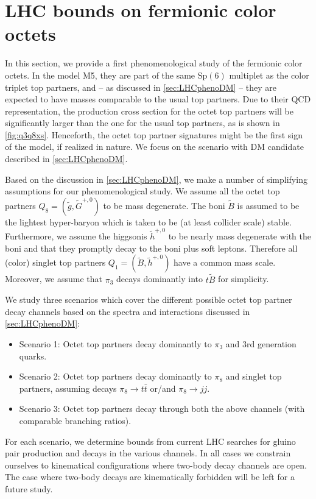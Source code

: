 \documentclass[preprintnumbers,nofootinbib,showpacs,eqsecnum,pre,12pt]{revtex4-1}
\newcommand{\Sp}{\text{Sp}}
\begin{document}
\section{LHC bounds on fermionic color octets}
\label{sec:numerics}

In this section, we provide a first phenomenological study of the fermionic color octets. In the model M5, they are part of the same $\Sp(6)$ multiplet as the color triplet top partners, and -- as discussed in \cref{sec:LHCphenoDM} -- they are expected to have masses comparable to the usual top partners. Due to their QCD representation, the production cross section for the octet top partners will be significantly
larger than the one for the usual top partners, as is shown in \cref{fig:q3q8xs}. Henceforth, the octet top partner signatures might be the first sign of the model, if realized in nature. We focus on the scenario with DM candidate described in \cref{sec:LHCphenoDM}.

Based on the discussion in \cref{sec:LHCphenoDM}, we make a number of simplifying assumptions for our phenomenological study. We assume all the octet top partners $Q_8=(\tilde{g}, \tilde{G}^{+,0})$ to be mass degenerate. The boni $\tilde{B}$ is assumed to be the lightest hyper-baryon which is taken to be (at least collider scale) stable.
Furthermore, we assume the  higgsonis $\tilde{h}^{+,0}$ to be nearly mass degenerate with the boni and that they promptly decay to the boni plus soft leptons. Therefore all (color) singlet top partners $Q_1=(\tilde{B},\tilde{h}^{+,0})$ have a common mass scale. Moreover, we assume that $\pi_3$ decays dominantly into $t\tilde B$ for simplicity.

We study three scenarios which cover the different possible octet top partner decay channels based on the spectra and interactions discussed in \cref{sec:LHCphenoDM}:
\begin{itemize}
    \item Scenario 1: Octet top partners decay dominantly to $\pi_3$ and 3rd generation quarks.
    \item Scenario 2: Octet top partners decay dominantly to $\pi_8$ and singlet top partners, assuming decays $\pi_8\to t \bar{t}$ or/and $\pi_8\to j j$.
    \item Scenario 3: Octet top partners decay through both the above channels (with comparable branching ratios).
\end{itemize}
For each scenario, we determine bounds from current LHC searches for gluino pair production and decays in the various channels. In all cases we constrain ourselves to kinematical configurations where two-body decay channels are open. The case where two-body decays are kinematically forbidden will be left for a future study.
\bigskip
\end{document}
